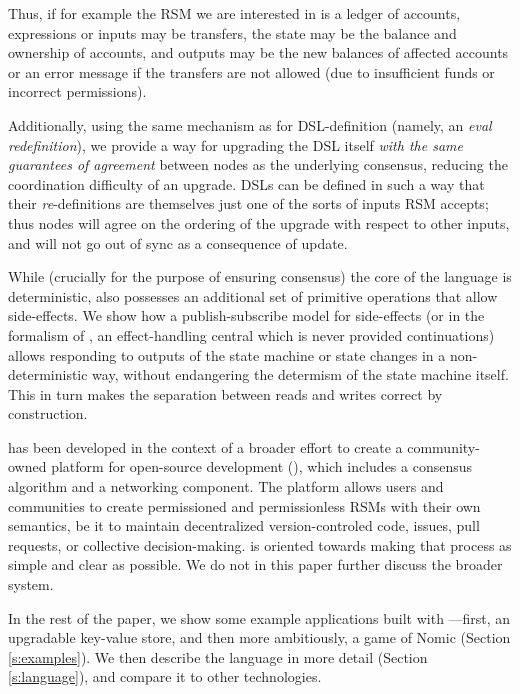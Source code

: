 Thus, if for example the RSM we are interested
in is a ledger of accounts, expressions or inputs may be transfers, the
state may be the balance and ownership of accounts, and outputs may be the new
balances of affected accounts or an error message if the transfers are not
allowed (due to insufficient funds or incorrect permissions).

Additionally, using the same mechanism as for DSL-definition (namely, an
\emph{eval redefinition}), we provide a way for upgrading the DSL itself
\emph{with the same guarantees of agreement} between nodes as the underlying
consensus, reducing the coordination difficulty of an upgrade. DSLs can be
defined in such a way that their \emph{re}-definitions are themselves just one of the
sorts of inputs RSM accepts; thus nodes will agree on the ordering of the
upgrade with respect to other inputs, and will not go out of sync as a
consequence of update.

While (crucially for the purpose of ensuring consensus) the core of the language
is deterministic, \rad{} also possesses an additional set of primitive operations
that allow side-effects. We show how a publish-subscribe model for side-effects
(or in the formalism of \cite{Cartwright1994}, an effect-handling central which
is never provided continuations) allows responding to outputs of the state
machine or state changes in a non-deterministic way, without endangering the
determism of the state machine itself. This in turn makes the separation between
reads and writes correct by construction.

\rad{} has been developed in the context of a broader effort to create a
community-owned platform for open-source development (\oscoin{}), which
includes a consensus algorithm and a networking component. The \oscoin{}
platform allows users and communities to create permissioned and permissionless
RSMs with their own semantics, be it to maintain decentralized
version-controled code, issues, pull requests, or collective decision-making.
\rad{} is
oriented towards making that process as simple and clear as possible. We do
not in this paper further discuss the broader \oscoin{} system.

In the rest of the paper, we show some example applications built with
\rad{}---first, an upgradable key-value store, and then more ambitiously, a game
of Nomic (Section \ref{s:examples}). We then describe the language in more
detail (Section \ref{s:language}), and compare it to other technologies.

